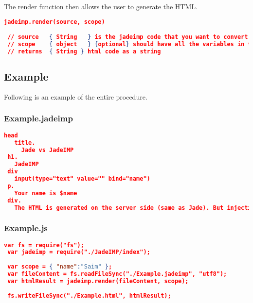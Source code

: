 \documentclass{article}
\begin{document}
The render function then allows the user to generate the HTML.

\begin{lstlisting}[language=json,firstnumber=1]
 jadeimp.render(source, scope)

 // source   { String   } is the jadeimp code that you want to convert to html
 // scope    { object   } {optional} should have all the variables in the jade code that is defined
 // returns  { String } html code as a string
\end{lstlisting}

\subsection{Example}
Following is an example of the entire procedure.

\subsubsection{Example.jadeimp}
\begin{lstlisting}[language=json,firstnumber=1]
 head
   title.
     Jade vs JadeIMP
 h1.
   JadeIMP
 div
   input(type="text" value="" bind="name")
 p.
   Your name is $name
 div.
   The HTML is generated on the server side (same as Jade). But injecting certain scripts into the generated code allows the HTML to be manipulated on the client side.
\end{lstlisting}

\subsubsection{Example.js}
\begin{lstlisting}[language=json,firstnumber=1]
 var fs = require("fs");
 var jadeimp = require("./JadeIMP/index");
 
 var scope = { "name":"Saim" };
 var fileContent = fs.readFileSync("./Example.jadeimp", "utf8");
 var htmlResult = jadeimp.render(fileContent, scope);
 
 fs.writeFileSync("./Example.html", htmlResult);
\end{lstlisting}
\end{document}
